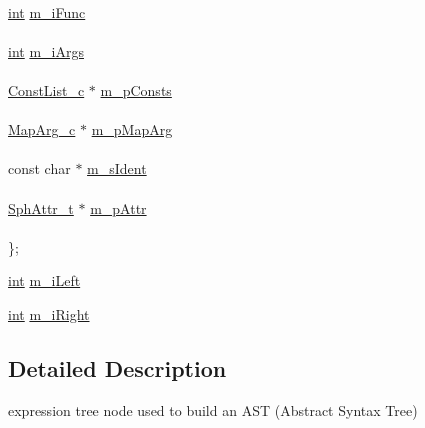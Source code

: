 \begin{DoxyCompactItemize}
\begin{tabbing}
\>\\
\>\hyperlink{sphinxexpr_8cpp_a4a26e8f9cb8b736e0c4cbf4d16de985e}{int} \hyperlink{structExprNode__t_a950d0840f6c2ccfdd28c7432411ca417}{m\_iFunc}\\
\>\\
\>\hyperlink{sphinxexpr_8cpp_a4a26e8f9cb8b736e0c4cbf4d16de985e}{int} \hyperlink{structExprNode__t_a00c9790bdea60e3da05d5b67920a7f10}{m\_iArgs}\\
\>\\
\>\hyperlink{classConstList__c}{ConstList\_c} $\ast$ \hyperlink{structExprNode__t_a1350967836c47fd22b1e71cea87cf54d}{m\_pConsts}\\
\>\\
\>\hyperlink{classMapArg__c}{MapArg\_c} $\ast$ \hyperlink{structExprNode__t_a4bf50267e002ad709b111b071abeeb47}{m\_pMapArg}\\
\>\\
\>const char $\ast$ \hyperlink{structExprNode__t_a2e58049c1d93320737052c5fa3a071c9}{m\_sIdent}\\
\>\\
\>\hyperlink{sphinx_8h_a7c122d91b0b52a0214ba176636bb1561}{SphAttr\_t} $\ast$ \hyperlink{structExprNode__t_ad91854673bc7551fb8835124e968371c}{m\_pAttr}\\
\>\\
\}; \\

\end{tabbing}\item 
\hyperlink{sphinxexpr_8cpp_a4a26e8f9cb8b736e0c4cbf4d16de985e}{int} \hyperlink{structExprNode__t_a1f64a3d3f4a2b1b2c89e911677c13916}{m\-\_\-i\-Left}
\item 
\hyperlink{sphinxexpr_8cpp_a4a26e8f9cb8b736e0c4cbf4d16de985e}{int} \hyperlink{structExprNode__t_a7a8e9fd262583802c38b6906e6df3751}{m\-\_\-i\-Right}
\end{DoxyCompactItemize}


\subsection{Detailed Description}
expression tree node used to build an A\-S\-T (Abstract Syntax Tree) 

